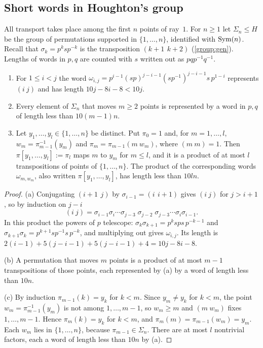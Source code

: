 \subsection{Short words in Houghton's group}\label{sec:pair-houghton}

All transport takes place among the first $n$ points of ray~$1$. For $n\ge1$ let $\Sigma_n\le H$ be the group of permutations supported
in $\{1,\dots,n\}$, identified with $\operatorname{Sym}(n)$. Recall that $\sigma_k=p^ksp^{-k}$ is the transposition $(k{+}1\ \,k{+}2)$
(\cref{group:gen}). Lengths of words in $p,q$ are counted with $s$ written out as $pqp^{-1}q^{-1}$.

\begin{lemma}\label{lem:pair-transp}
\leavevmode
\begin{enumerate}[label=(\alph*),itemsep=1pt]
\item For $1\le i<j$ the word $\omega_{i,j}=p^{i-1}(sp)^{j-i-1}(sp^{-1})^{j-i-1}s\,p^{1-i}$ represents $(i\ j)$ and has length
$10j-8i-8<10j$.
\item Every element of $\Sigma_n$ that moves $m\ge2$ points is represented by a word in $p,q$ of length less than $10(m-1)n$.
\item Let $y_1,\dots,y_l\in\{1,\dots,n\}$ be distinct. Put $\pi_0=1$ and, for $m=1,\dots,l$, $w_m=\pi_{m-1}^{-1}(y_m)$ and
$\pi_m=\pi_{m-1}(m\ w_m)$, where $(m\ m)=1$. Then $\pi[y_1,\dots,y_l]:=\pi_l$ maps $m$ to $y_m$ for $m\le l$, and it is a product of at
most $l$ transpositions of points of $\{1,\dots,n\}$. The product of the corresponding words $\omega_{m,w_m}$, also written
$\pi[y_1,\dots,y_l]$, has length less than $10ln$.
\end{enumerate}
\end{lemma}

\begin{proof}
(a) Conjugating $(i{+}1\ \,j)$ by $\sigma_{i-1}=(i\ \,i{+}1)$ gives $(i\ j)$ for $j>i+1$, so by induction on $j-i$
\[
(i\ j)=\sigma_{i-1}\sigma_i\cdots\sigma_{j-3}\;\sigma_{j-2}\;\sigma_{j-3}\cdots\sigma_i\sigma_{i-1}.
\]
In this product the powers of $p$ telescope: $\sigma_k\sigma_{k+1}=p^ksps\,p^{-k-1}$ and $\sigma_{k+1}\sigma_k=p^{k+1}sp^{-1}s\,p^{-k}$, and
multiplying out gives $\omega_{i,j}$. Its length is $2(i-1)+5(j-i-1)+5(j-i-1)+4=10j-8i-8$.

(b) A permutation that moves $m$ points is a product of at most $m-1$ transpositions of those points, each represented by (a) by a word
of length less than $10n$.

(c) By induction $\pi_{m-1}(k)=y_k$ for $k<m$. Since $y_m\ne y_k$ for $k<m$, the point $w_m=\pi_{m-1}^{-1}(y_m)$ is not among $1,\dots,m-1$,
so $w_m\ge m$ and $(m\ w_m)$ fixes $1,\dots,m-1$. Hence $\pi_m(k)=y_k$ for $k<m$, and $\pi_m(m)=\pi_{m-1}(w_m)=y_m$. Each $w_m$ lies in
$\{1,\dots,n\}$, because $\pi_{m-1}\in\Sigma_n$. There are at most $l$ nontrivial factors, each a word of length less than $10n$ by (a).
\end{proof}

